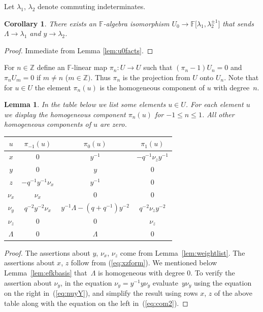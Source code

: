 \documentclass[pdftex]{sigma}
\numberwithin{equation}{section}
\newtheorem{Corollary}[Theorem]{Corollary}
\newtheorem{Lemma}[Theorem]{Lemma}
\begin{document}
Let $\lambda_1$, $\lambda_2$ denote commuting
indeterminates.

\begin{Corollary}
\label{cor:laurant}
There exists an  $\mathbb F$-algebra isomorphism
$U_0 \to \mathbb F\lbrack \lambda_1, \lambda^{\pm 1}_2]$
that sends
$\Lambda \to \lambda_1$
and
$y \to \lambda_2$.
\end{Corollary}

\begin{proof}
Immediate from Lemma
\ref{lem:u0facts}.
\end{proof}

\begin{Definition}
\rm For $n \in \mathbb Z$ def\/ine an $\mathbb F$-linear map
$\pi_n:
U \to
U
$
such that $(\pi_n-1)U_n=0$ and
$\pi_n U_m=0$ if $m\not=n$  ($m\in \mathbb Z)$.
Thus $\pi_n$ is the projection
from $U $ onto $U_n$.
Note that for $u \in
U$ the element
$\pi_n(u)$
is the homogeneous component of $u$ with degree~$n$.
\end{Definition}

\begin{Lemma}
\label{lem:firsttable}
In the table below we list some
elements $u \in
U$.
For each element $u$ we display the homogeneous
component
$\pi_n(u)$ for $-1\leq n \leq 1$.
All other homogeneous components of $u$ are zero.
\begin{center}
\begin{tabular}{c| c  c c}
$u$ &  $\pi_{-1}(u)$ & $ \pi_0(u)$  & $ \pi_1(u)$
\\
\hline
\hline
$x$ & $0$ & $y^{-1}$ & $-q^{-1} \nu_z y^{-1}$\tsep{2pt}
\\
$y$ & $0$ & $y$ & $0$
\\
$z$ & $-q^{-1}y^{-1}\nu_x$ & $y^{-1}$ & $0$
\\
\hline
$\nu_x$ & $\nu_x$ & $0$ & $0$
\\
$\nu_y$ & $q^{-2}y^{-2}\nu_x$ & $y^{-1}\Lambda-(q+q^{-1})y^{-2}$
& $q^{-2}\nu_z y^{-2}$
\\
$\nu_z$ & $0$ & $0$ & $\nu_z$
\\
\hline
$\Lambda $ & $0$ & $\Lambda $ & $0$
\end{tabular}
        \end{center}
\end{Lemma}
\begin{proof}
The assertions about
$y$, $\nu_x$, $\nu_z$ come  from
Lemma~\ref{lem:weightlist}.
The assertions about $x$, $z$ follow from
(\ref{eq:xzform}).
We mentioned below
Lemma~\ref{lem:efkbasis}
that~$\Lambda $ is homogeneous with degree 0.
To verify the assertion about
$\nu_y$, in the equation $ \nu_y = y^{-1} y \nu_y$
evaluate~$y\nu_y $ using
the equation on the right in~(\ref{eq:nuyY}), and simplify the
result using
rows $x$, $z$ of the above table
along with the
equation on the left in~(\ref{eq:com2}).
\end{proof}
\end{document}
